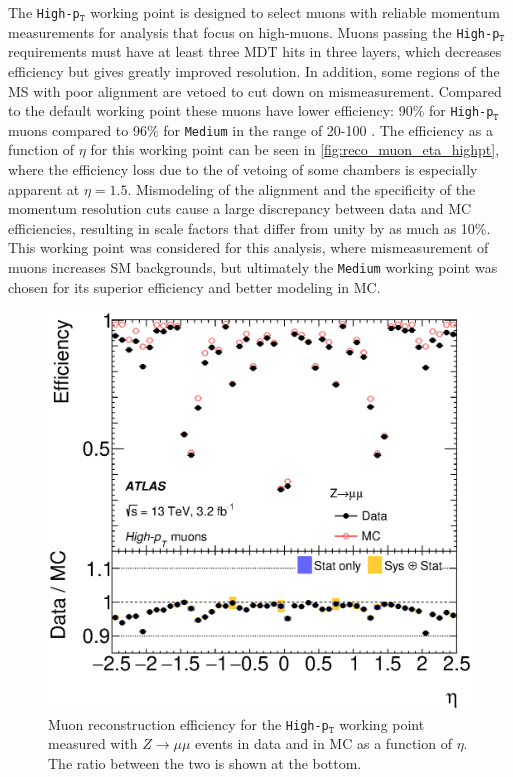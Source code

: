 The \texttt{High-p$_\texttt{T}$} working point is designed to select muons with reliable momentum measurements for analysis that focus on high-\pt muons. Muons passing the \texttt{High-p$_\texttt{T}$} requirements must have at least three \ac{MDT} hits in three layers, which decreases efficiency but gives greatly improved \pt resolution. In addition, some regions of the \ac{MS} with poor alignment are vetoed to cut down on mismeasurement. Compared to the default working point these muons have lower efficiency: 90\% for \texttt{High-p$_\texttt{T}$} muons compared to 96\% for \texttt{Medium} in the \pt range of 20-100 \gev. The efficiency as a function of $\eta$ for this working point can be seen in \autoref{fig:reco_muon_eta_highpt}, where the efficiency loss due to the of vetoing of some chambers is especially apparent at $\eta=1.5$. Mismodeling of the alignment and the specificity of the momentum resolution cuts cause a large discrepancy between data and \ac{MC} efficiencies, resulting in scale factors that differ from unity by as much as 10\%. This working point was considered for this analysis, where mismeasurement of muons increases \ac{SM} backgrounds, but ultimately the \texttt{Medium} working point was chosen for its superior efficiency and better modeling in \ac{MC}.

\begin{centering}
\begin{figure}[!hbt]
\myfloatalign
\includegraphics[width=.9\linewidth]{figures/reco/fig_03c.eps}
\caption{Muon reconstruction efficiency for the \texttt{High-p$_\texttt{T}$} working point measured with $Z\rightarrow\mu\mu$ events in data and in \ac{MC} as a function of $\eta$. The ratio between the two is shown at the bottom. \cite{1603.05598} }
\label{fig:reco_muon_eta_highpt}
\end{figure}
\end{centering}

